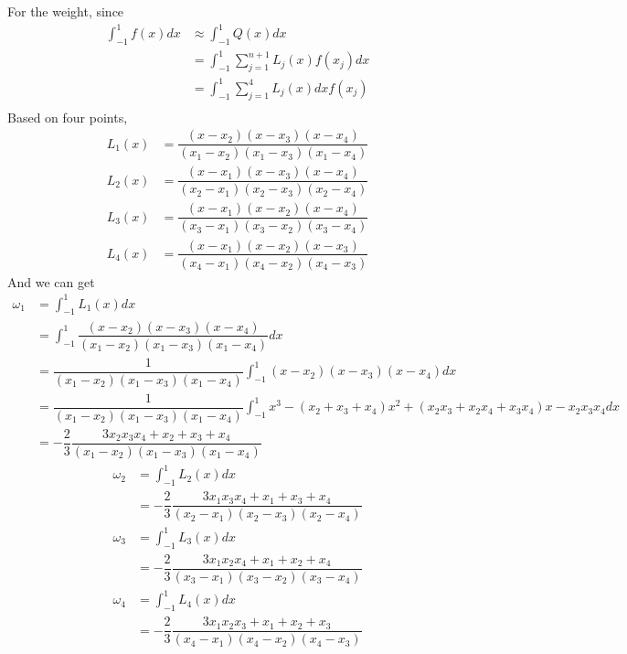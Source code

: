 \documentclass{article}
\begin{document}
\begin{enumerate}
For the weight, since \begin{align*}
\int_{-1}^1 f(x) dx &\approx \int_{-1}^1 Q(x) dx\\
&=\int_{-1}^1 \sum_{j=1}^{n+1} L_j(x) f(x_j) dx\\
&=\int_{-1}^1 \sum_{j=1}^{4} L_j(x)dx f(x_j)\\
\end{align*}
Based on four points, \begin{align*}
L_1(x) &= \dfrac{(x-x_2)(x-x_3)(x-x_4)}{(x_1-x_2)(x_1-x_3)(x_1-x_4)}\\
L_2(x) &= \dfrac{(x-x_1)(x-x_3)(x-x_4)}{(x_2-x_1)(x_2-x_3)(x_2-x_4)}\\
L_3(x) &= \dfrac{(x-x_1)(x-x_2)(x-x_4)}{(x_3-x_1)(x_3-x_2)(x_3-x_4)}\\
L_4(x) &= \dfrac{(x-x_1)(x-x_2)(x-x_3)}{(x_4-x_1)(x_4-x_2)(x_4-x_3)}
\end{align*}
And we can get \begin{align*}
\omega_1&=\int_{-1}^1L_1(x) dx\\
&=\int_{-1}^1 \dfrac{(x-x_2)(x-x_3)(x-x_4)}{(x_1-x_2)(x_1-x_3)(x_1-x_4)} dx\\
&=\dfrac{1}{(x_1-x_2)(x_1-x_3)(x_1-x_4)}\int_{-1}^1(x-x_2)(x-x_3)(x-x_4) dx\\
&=\dfrac{1}{(x_1-x_2)(x_1-x_3)(x_1-x_4)}\int_{-1}^1x^3-(x_2+x_3+x_4)x^2+(x_2x_3+x_2x_4+x_3x_4)x - x_2x_3x_4 dx\\
&=-\dfrac{2}{3}\dfrac{3x_2x_3x_4+x_2+x_3+x_4}{(x_1-x_2)(x_1-x_3)(x_1-x_4)}
        \end{align*}\begin{align*}
\omega_2&=\int_{-1}^1L_2(x) dx\\
&=-\dfrac{2}{3}\dfrac{3x_1x_3x_4+x_1+x_3+x_4}{(x_2-x_1)(x_2-x_3)(x_2-x_4)}\\
\omega_3&=\int_{-1}^1L_3(x) dx\\
&=-\dfrac{2}{3}\dfrac{3x_1x_2x_4+x_1+x_2+x_4}{(x_3-x_1)(x_3-x_2)(x_3-x_4)}\\
\omega_4&=\int_{-1}^1L_4(x) dx\\
&=-\dfrac{2}{3}\dfrac{3x_1x_2x_3+x_1+x_2+x_3}{(x_4-x_1)(x_4-x_2)(x_4-x_3)}
\end{align*}


\end{enumerate}
\end{document}
